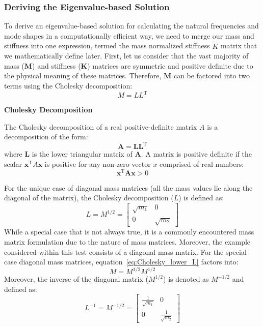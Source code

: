 \documentclass[12pt,letter]{article}
\begin{document}
\subsubsection{Deriving the Eigenvalue-based Solution}

To derive an eigenvalue-based solution for calculating the natural frequencies and mode shapes in a computationally efficient way, we need to merge our mass and stiffness into one expression, termed the  mass normalized stiffness $\widetilde{K}$ matrix that we mathematically define later. First, let us consider that the vast majority of mass ($\textbf{M}$) and stiffness ($\textbf{K}$) matrices are symmetric and positive definite due to the physical meaning of these matrices. Therefore, $\textbf{M}$ can be factored into two terms using the Cholesky decomposition:
 \begin{equation}
  M=LL^{\text{T}}
 \end{equation}
\begin{review}
\textbf{Cholesky Decomposition} 

 \noindent The Cholesky decomposition of a real positive-definite matrix $A$ is a decomposition of the form:
 \begin{equation}
  \textbf{A}=\textbf{LL}^{\text{T}}
  \end{equation}
 where $\textbf{L}$ is the lower triangular matrix of $\textbf{A}$.  A matrix is positive definite if the scalar $\textbf{x}^{\text{T}}A\textbf{x}$ is positive for any non-zero vector $x$ comprised of real numbers:
 \begin{equation}
  \textbf{x}^{\text{T}}\textbf{A}\textbf{x} > 0
 \end{equation}
\end{review} 

 For the unique case of diagonal mass matrices (all the mass values lie along the diagonal of the matrix), the Cholesky decomposition ($L$) is defined as:
 \begin{equation}
  L = M^{1/2} = \begin{bmatrix} \sqrt{m_1} & 0 \\  0  & \sqrt{m_2} \end{bmatrix} 
  \label{eq:Cholesky_lower_L}
 \end{equation}
 While a special case that is not always true, it is a commonly encountered mass matrix formulation due to the nature of mass matrices. Moreover, the example considered within this test consists of a diagonal mass matrix. For the special case  diagonal mass matrices, equation~\ref{eq:Cholesky_lower_L} factors into:
 \begin{equation}
  M = M^{1/2}M^{1/2}
 \end{equation}
 Moreover, the inverse of the diagonal matrix ($M^{1/2}$) is denoted as $M^{-1/2}$ and defined as:
 \begin{equation}
  L^{-1} = M^{-1/2} = \begin{bmatrix} \frac{1}{\sqrt{m_1}} & 0 \\  0  & \frac{1}{\sqrt{m_2}} \end{bmatrix} 
 \end{equation} 
\end{document}
